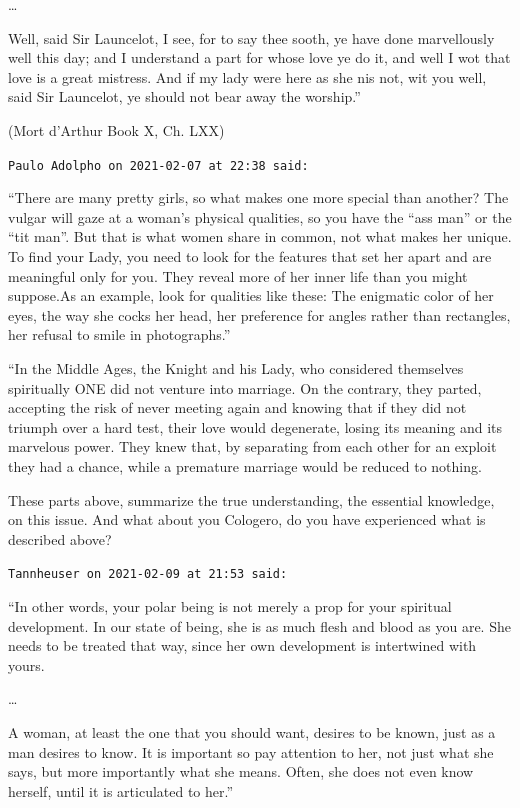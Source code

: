 \begin{footnotesize}
\begin{sffamily}
…

Well, said Sir Launcelot, I see, for to say thee sooth, ye have done marvellously well this day; and I understand a part for whose love ye do it, and well I wot that love is a great mistress. And if my lady were here as she nis not, wit you well, said Sir Launcelot, ye should not bear away the worship.”

(Mort d'Arthur Book X, Ch. LXX)


\hfill

\texttt{Paulo Adolpho on 2021-02-07 at 22:38 said: }

“There are many pretty girls, so what makes one more special than another? The vulgar will gaze at a woman's physical qualities, so you have the “ass man” or the “tit man”. But that is what women share in common, not what makes her unique. To find your Lady, you need to look for the features that set her apart and are meaningful only for you. They reveal more of her inner life than you might suppose.As an example, look for qualities like these: The enigmatic color of her eyes, the way she cocks her head, her preference for angles rather than rectangles, her refusal to smile in photographs.”

“In the Middle Ages, the Knight and his Lady, who considered themselves spiritually ONE did not venture into marriage. On the contrary, they parted, accepting the risk of never meeting again and knowing that if they did not triumph over a hard test, their love would degenerate, losing its meaning and its marvelous power. They knew that, by separating from each other for an exploit they had a chance, while a premature marriage would be reduced to nothing. 

These parts above, summarize the true understanding, the essential knowledge, on this issue. And what about you Cologero, do you have experienced what is described above?


\hfill

\texttt{Tannheuser on 2021-02-09 at 21:53 said: }

“In other words, your polar being is not merely a prop for your spiritual development. In our state of being, she is as much flesh and blood as you are. She needs to be treated that way, since her own development is intertwined with yours.

…

A woman, at least the one that you should want, desires to be known, just as a man desires to know. It is important so pay attention to her, not just what she says, but more importantly what she means. Often, she does not even know herself, until it is articulated to her.”


\end{sffamily}
\end{footnotesize}
